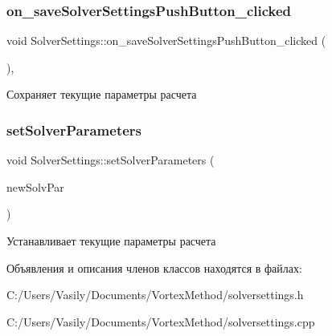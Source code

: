 \subsubsection{\texorpdfstring{on\+\_\+save\+Solver\+Settings\+Push\+Button\+\_\+clicked}{on\_saveSolverSettingsPushButton\_clicked}}
{\footnotesize\ttfamily void Solver\+Settings\+::on\+\_\+save\+Solver\+Settings\+Push\+Button\+\_\+clicked (\begin{DoxyParamCaption}{ }\end{DoxyParamCaption})\hspace{0.3cm}{\ttfamily [private]}, {\ttfamily [slot]}}

Сохраняет текущие параметры расчета \mbox{\label{class_solver_settings_ac72ad464747097ad1dc8b88768ca7cad}} 
\subsubsection{\texorpdfstring{set\+Solver\+Parameters}{setSolverParameters}}
{\footnotesize\ttfamily void Solver\+Settings\+::set\+Solver\+Parameters (\begin{DoxyParamCaption}\item[{\mbox{\hyperlink{struct_solver_parameters}{Solver\+Parameters}} \&}]{new\+Solv\+Par }\end{DoxyParamCaption})\hspace{0.3cm}{\ttfamily [slot]}}

Устанавливает текущие параметры расчета 

Объявления и описания членов классов находятся в файлах\+:\begin{DoxyCompactItemize}
\item 
C\+:/\+Users/\+Vasily/\+Documents/\+Vortex\+Method/solversettings.\+h\item 
C\+:/\+Users/\+Vasily/\+Documents/\+Vortex\+Method/solversettings.\+cpp\end{DoxyCompactItemize}
